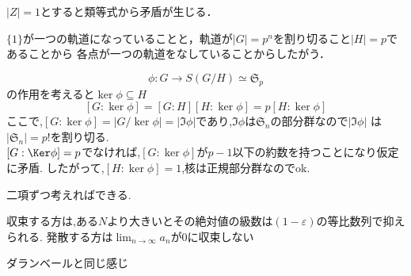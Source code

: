 \documentclass[leqno]{ltjsarticle}%
\begin{document}
$|Z|=1$とすると類等式から矛盾が生じる．

$\{1\}$が一つの軌道になっていることと，軌道が$|G|=p^n$を割り切ること$|H|=p$であることから
各点が一つの軌道をなしていることからしたがう．

\[\phi\colon G \to S(G/H) \simeq \mathfrak{S}_p\]
の作用を考えると$\ker \phi \subseteq H$
\[[G:\ker \phi] = [G:H][H:\ker\phi] = p[H:\ker\phi] \]
ここで,$[G:\ker\phi]=|G/\ker\phi|=|\Im\phi|$であり,$\Im\phi$は$\mathfrak{S}_n$の部分群なので$|\Im\phi|$ は$|\mathfrak{S}_n|=p!$を割り切る.\\
$[G:\Ker\phi]=p$でなければ,$[G:\ker\phi]$が$p-1$以下の約数を持つことになり仮定に矛盾.
したがって,$[H:\ker\phi]=1$,核は正規部分群なのでok.


二項ずつ考えればできる.

収束する方は,ある$N$より大きいとその絶対値の級数は$(1-\varepsilon)$の等比数列で抑えられる.
発散する方は$\lim_{n\to\infty}a_n$が0に収束しない

ダランベールと同じ感じ
\end{document}
